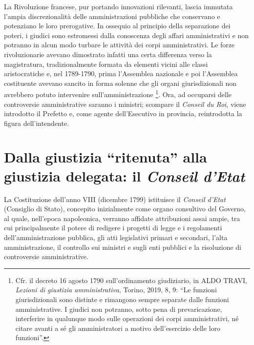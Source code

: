 \documentclass[12pt,it,a4paper,]{report}
\begin{document}
La Rivoluzione francese, pur portando innovazioni rilevanti, lascia
immutata l'ampia discrezionalità delle amministrazioni pubbliche che
conservano e potenziano le loro prerogative. In ossequio al principio
della separazione dei poteri, i giudici sono estromessi dalla conoscenza
degli affari amministrativi e non potranno in alcun modo turbare le
attività dei corpi amministrativi. Le forze rivoluzionarie avevano
dimostrato infatti una certa differenza verso la magistratura,
tradizionalmente formata da elementi vicini alle classi aristocratiche
e, nel 1789-1790, prima l'Assemblea nazionale e poi l'Assemblea
costituente avevano sancito in forma solenne che gli organi
giurisdizionali non avrebbero potuto intervenire sull'amministrazione
\footnote{Cfr. il decreto 16 agosto 1790 sull'ordinamento giudiziario,
  in ALDO TRAVI, \emph{Lezioni di giustizia amministrativa}, Torino,
  2019, 8, 9: ``Le funzioni giurisdizionali sono distinte e rimangono
  sempre separate dalle funzioni amministrative. I giudici non potranno,
  sotto pena di prevaricazione, interferire in qualunque modo sulle
  operazioni dei corpi amministrativi, né citare avanti a sé gli
  amministratori a motivo dell'esercizio delle loro funzioni''.}. Ora,
ad occuparsi delle controversie amministrative saranno i ministri;
scompare il \emph{Conseil du Roi}, viene introdotto il Prefetto e, come
agente dell'Esecutivo in provincia, reintrodotta la figura
dell'intendente.

\hypertarget{dalla-giustizia-ritenuta-alla-giustizia-delegata-il-conseil-detat}{%
\section{\texorpdfstring{Dalla giustizia ``ritenuta'' alla giustizia
delegata: il \emph{Conseil
d'Etat}}{Dalla giustizia ``ritenuta'' alla giustizia delegata: il Conseil d'Etat}}\label{dalla-giustizia-ritenuta-alla-giustizia-delegata-il-conseil-detat}}

La Costituzione dell'anno VIII (dicembre 1799) istituisce il
\emph{Conseil d'Etat} (Consiglio di Stato), concepito inizialmente come
organo consultivo del Governo, al quale, nell'epoca napoleonica,
verranno affidate attribuzioni assai ampie, tra cui principalmente il
potere di redigere i progetti di legge e i regolamenti
dell'amministrazione pubblica, gli atti legislativi primari e secondari,
l'alta amministrazione, il controllo sui ministri e sugli enti pubblici
e la risoluzione di controversie amministrative.
\end{document}
